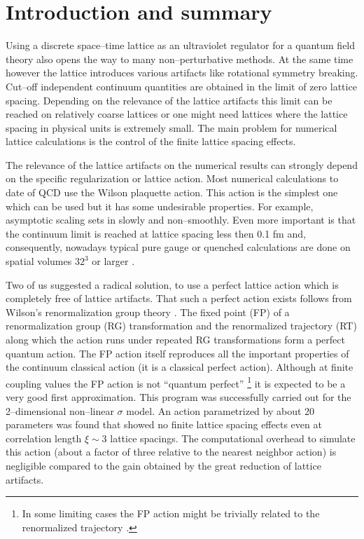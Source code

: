\eject

\section{Introduction and summary}


Using a discrete space--time lattice as an ultraviolet regulator
for a quantum field theory
 also opens the way to many non--perturbative
methods. At the same time however the lattice
introduces various artifacts like rotational symmetry
breaking. 
 Cut--off independent continuum quantities are obtained
in the limit of zero lattice spacing. Depending on the relevance
of the lattice artifacts this limit can be reached on relatively
coarse lattices or one might need lattices where the lattice
spacing in physical units is extremely small.
The main problem for
numerical lattice calculations is the  control of the  finite
lattice spacing effects.

The relevance of the lattice artifacts on the numerical results
can strongly
depend on the specific regularization  or lattice action.
Most numerical calculations  to date of QCD use the Wilson plaquette
action. This action is the simplest
 one which can be used but it has some undesirable properties.
For example, asymptotic scaling sets in slowly and non--smoothly.
Even more important is that
the continuum limit is reached at lattice spacing less
then 0.1 fm
and, consequently,  nowadays typical pure gauge or quenched
calculations are done on spatial volumes $32^3$
or larger \cite{WEINGARTEN}.



Two of us \cite{HN} suggested a radical solution, to use a perfect
lattice action which is completely free of lattice artifacts.
That such a perfect action exists follows from Wilson's
renormalization group theory \cite{sigma5}. 
The fixed point (FP) of a renormalization group (RG) transformation
and the renormalized trajectory (RT)
along which the action runs under repeated RG transformations
form a perfect quantum action. The FP action itself reproduces
all the important properties of the continuum classical action
(it is a classical perfect action). Although at finite coupling values
the FP action is not ``quantum perfect'' \footnote{In some limiting cases
the FP action might be trivially related to the renormalized trajectory
 \cite{BIETENHOLZ}.}
it is expected to be
a very good first approximation.
This program was successfully
carried out for the 2--dimensional non--linear $\sigma$ model. An
action parametrized by about 20 parameters was found that showed
no finite lattice spacing effects even at correlation length $\xi
\sim 3$ lattice spacings. The computational overhead to simulate this action
(about a factor of three relative to the nearest neighbor action)
is negligible compared to the gain obtained by the great reduction
of lattice artifacts.

